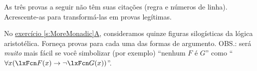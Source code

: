 \problempart
\label{pr.justifyFOLproof}
As três provas a seguir não têm suas citações (regra e números de linha). Acrescente-as para transformá-las em provas legítimas.
\begin{compactlist}
\item \begin{fitchproof}
	\open
	\close
{} {}
\end{fitchproof}

\item \begin{fitchproof}
 {}
 {}
\end{fitchproof}

\item \begin{fitchproof}
\open
\close
{}
\end{fitchproof}
\end{compactlist}

\problempart
\label{pr.BarbaraEtc.proof1}
No \hyperref[pr.BarbaraEtc]{exercício \ref*{s:MoreMonadic}A}, consideramos quinze figuras silogísticas da lógica aristotélica. Forneça
provas para cada uma das formas de argumento. OBS.: será
\emph{muito} mais fácil se você simbolizar (por exemplo)
\textquotedblleft nenhum $F$ é $G$\textquotedblright{} como
\textquotedblleft $\forall x (\atom{F}{x} \eif \enot \atom{G}{x})$\textquotedblright{}.

